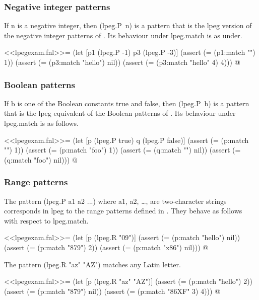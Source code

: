 \documentclass{article}
\begin{document}
\subsubsection{Negative integer patterns}
\label{sec:owdg0noo}

If \textsf{n} is a negative integer, then \textsf{(lpeg.P~n)} is a
pattern that is the \textsf{lpeg} version of the negative integer
patterns of .  Its behaviour under
\textsf{lpeg.match} is as under.
\begin{codechunk}
<<lpegexam.fnl>>=
(let [p1 (lpeg.P -1)
      p3 (lpeg.P -3)]
  (assert (= (p1:match "") 1))
  (assert (= (p3:match "hello") nil))
  (assert (= (p3:match "hello" 4) 4)))
@
\end{codechunk}

\subsubsection{Boolean patterns}
\label{sec:pzx44una}

If \textsf{b} is one of the Boolean constants \textsf{true} and
\textsf{false}, then \textsf{(lpeg.P~b)} is a pattern that is the
\textsf{lpeg} equivalent of the Boolean patterns of
.  Its behaviour under \textsf{lpeg.match} is as
follows.
\begin{codechunk}
<<lpegexam.fnl>>=
(let [p (lpeg.P true)
      q (lpeg.P false)]
  (assert (= (p:match "") 1))
  (assert (= (p:match "foo") 1))
  (assert (= (q:match "") nil))
  (assert (= (q:match "foo") nil)))
@
\end{codechunk}

\subsubsection{Range patterns}
\label{sec:lodb4xcu}

The pattern \textsf{(lpeg.P a1 a2 ...)} where \textsf{a1},
\textsf{a2}, \dots, are two-character strings corresponds in
\textsf{lpeg} to the range patterns defined in .
They behave as follows with respect to \textsf{lpeg.match}.
\begin{codechunk}
<<lpegexam.fnl>>=
(let [p (lpeg.R "09")]
  (assert (= (p:match "hello") nil))
  (assert (= (p:match "879") 2))
  (assert (= (p:match "x86") nil)))
@
\end{codechunk}

The pattern \textsf{(lpeg.R "az" "AZ")} matches any Latin letter.
\begin{codechunk}
<<lpegexam.fnl>>=
(let [p (lpeg.R "az" "AZ")]
  (assert (= (p:match "hello") 2))
  (assert (= (p:match "879") nil))
  (assert (= (p:match "86XF" 3) 4)))
@
\end{codechunk}
\end{document}
